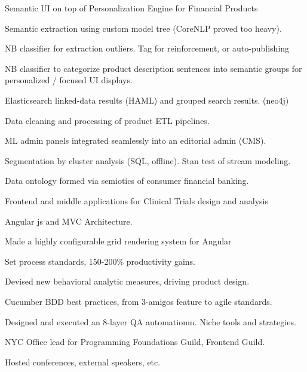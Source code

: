 \documentclass[letterpaper]{deedy-resume} %
\begin{document}
\begin{minipage}[t]{0.66\textwidth}
\sectionspace %



\vspace{\topsep} %
Semantic UI on top of Personalization Engine for Financial Products
\begin{tightitemize}
\item Semantic extraction using custom model tree (CoreNLP proved too heavy).
\item NB classifier for extraction outliers. Tag for reinforcement, or auto-publishing
\item NB classifier to categorize product description sentences into semantic groups for personalized / focused UI displays.
\item Elasticsearch linked-data results (HAML) and grouped search results. (neo4j)
\item Data cleaning and processing of product ETL pipelines.
\item ML admin panels integrated seamlessly into an editorial admin (CMS).
\item Segmentation by cluster analysis (SQL, offline).  Stan test of stream modeling.
\item Data ontology formed via semiotics of consumer financial banking.

\end{tightitemize}

\sectionspace %



Frontend and middle applications for Clinical Trials design and analysis
\vspace{\topsep} %
\begin{tightitemize}
\item Angular js and MVC Architecture.
\item Made a highly configurable grid rendering system for Angular
\item Set process standards, 150-200\% productivity gains.
\item Devised new behavioral analytic measures, driving product design.
\item Cucumber BDD best practices, from 3-amigos feature to agile standards.
\item Designed and executed an 8-layer QA automatiomn. Niche tools and strategies.
\item NYC Office lead for Programming Foundations Guild, Frontend Guild.
\item Hosted conferences, external speakers, etc.
\end{tightitemize}


\end{minipage}
\end{document}
